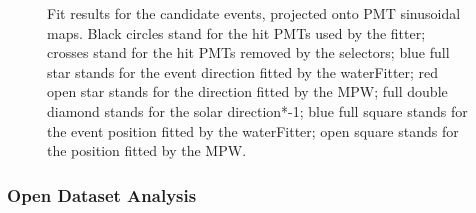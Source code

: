 \begin{figure}[htbp]
{	}
	\caption{Fit results for the candidate events, projected onto PMT sinusoidal maps. Black circles stand for
		the hit PMTs used by the fitter; crosses stand for the hit PMTs removed by the selectors; blue full star stands for the event direction fitted by the waterFitter; red open star stands for the direction fitted by the MPW; full double diamond stands for the solar direction*-1; blue full square stands for the event position fitted by the waterFitter; open square stands for the position fitted by the MPW.}
	\label{openDataSetCandidate}
\end{figure}


\subsubsection{Open Dataset Analysis}

